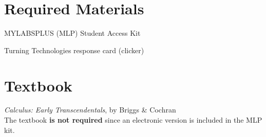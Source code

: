 \documentclass[margin,line,pifont,palatino,courier]{res}
\newenvironment{list1}{
  \begin{list}{\ding{113}}{%
      \setlength{\itemsep}{0in}
      \setlength{\parsep}{0in} \setlength{\parskip}{0in}
      \setlength{\topsep}{0in} \setlength{\partopsep}{0in}
      \setlength{\leftmargin}{0.17in}}}{\end{list}}
\begin{document}
\begin{resume}
\section{\sc Required Materials}
\begin{list1}
\item MYLABSPLUS (MLP) Student Access Kit 
\item Turning Technologies response card (clicker)
\end{list1}

\section{\sc Textbook} \emph{Calculus: Early Transcendentals}, by Briggs \& Cochran \\
The textbook {\bf is not required} since an electronic version is included in the MLP kit.  


\end{resume}
\end{document}

